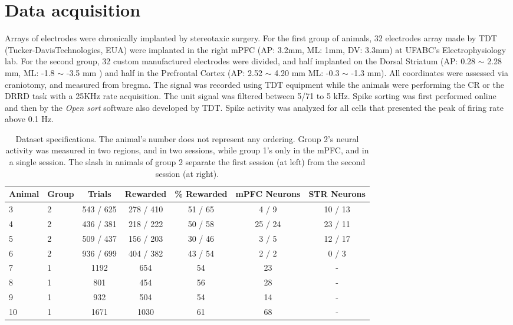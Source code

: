 \chapter{Data acquisition}
\label{chap:acquisition}

Arrays of electrodes were chronically implanted by stereotaxic surgery. For the first group of animals, 32 electrodes array made by TDT (Tucker-DavisTechnologies, EUA) were implanted in the right mPFC (AP: 3.2mm, ML: 1mm, DV: 3.3mm) at UFABC's Electrophysiology lab. For the second group, 32 custom manufactured electrodes were divided, and half implanted on the Dorsal Striatum (AP: 0.28 $\sim$ 2.28 mm, ML: -1.8 $\sim$ -3.5 mm ) and half in the Prefrontal Cortex (AP: 2.52 $\sim$ 4.20 mm ML: -0.3 $\sim$ -1.3 mm). All coordinates were assessed via craniotomy, and measured from bregma.
The signal was recorded  using TDT equipment while the animals were performing the CR or the DRRD task with a 25KHz rate acquisition. The unit signal was filtered between 5/71 to 5 kHz. Spike sorting was first performed online and then by the \textit{Open sort} software also developed by TDT. Spike activity was analyzed for all cells that presented the peak of firing rate above 0.1 Hz. 
			
\begin{table}[htp]
    \centering
    \begin{tabular}{l|l|c|c|c|c|c}
        Animal & Group & Trials & Rewarded & \% Rewarded &  mPFC Neurons & STR Neurons \\\hline
        3 & 2 &  543 / 625  &    278 / 410 &   51 / 65 &       4 / 9    &   10 / 13 \\
        4 & 2 &  436 / 381  &    218 / 222 &  50 / 58  &      25 / 24   &   23 / 11 \\
        5 & 2 &  509 / 437  &    156 / 203 &  30 / 46  &      3 / 5     &   12 / 17 \\
        6 & 2 &  936 / 699  &    404 / 382 &  43 / 54  &      2 / 2     &   0 / 3   \\
        7 & 1 &     1192    &    654       &    54     &     23       &     -     \\
        8 & 1 &      801    &    454       &    56     &     28       &     -     \\
        9 & 1 &      932    &    504       &    54     &     14       &     -     \\
        10& 1 &     1671    &    1030      &    61     &     68       &     -     \\
    \end{tabular}
    \caption[Dataset specifications]{Dataset specifications. The animal's number does not represent any ordering. Group 2's neural activity was measured in two regions, and in two sessions, while group 1's only in the mPFC, and in a single session. The slash in animals of group 2 separate the first session (at left) from the second session (at right).}
    \label{tab:subjects}
\end{table}